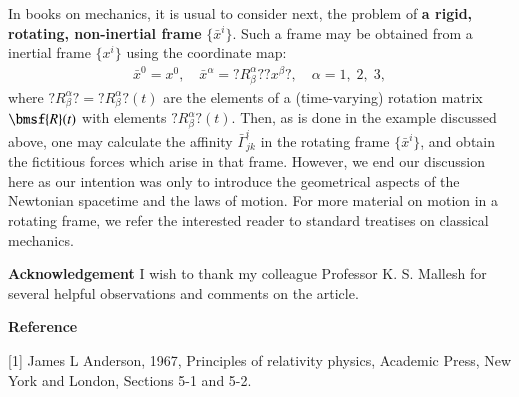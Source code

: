 \documentclass[10pt]{article}
\begin{document}
In books on mechanics, it is usual to consider next,  the 
problem of \textbf{a rigid, rotating, non-inertial  frame}  
$\{\bar{x}^i\}$. Such a frame may be obtained
from a inertial frame  $\{ x^i\}$ using the coordinate map:
\begin{align}\label{40}
\bar{x}^0=x^0, \quad
\bar{x}^\alpha=?{R}^{\alpha}_{\beta}?
?{x}^{\beta}_{}?, \quad \alpha=1,\;2,\;3,
\end{align}
where  $ ?{R}^{\alpha}_{\beta}?=
?{R}^{\alpha}_{\beta}? (t)$ 
are the elements of a (time-varying) rotation matrix 
${\bmsf{R}} (t)$ with elements $?{R}^{\alpha}_{\beta}?(t)$. 
Then, as is done in the example discussed above, one may 
calculate the affinity $\bar{\Gamma}^i_{jk}$ in the rotating 
frame $\{\bar{x}^i\}$, and obtain the fictitious forces 
which arise in that frame. However, we end our discussion 
here as our intention was only to introduce the geometrical 
aspects of the Newtonian spacetime and the  laws of motion. 
For more material on motion in a rotating frame, we refer 
the interested reader to standard treatises on 
classical mechanics.

\textbf{Acknowledgement} I wish to thank my 
colleague Professor K. S. Mallesh for several helpful 
observations and comments on the article.

\textbf{Reference}

[1] James L Anderson, 1967, Principles of relativity 
physics, Academic Press, New York and London, Sections 5-1 
and 5-2.
\end{document}
